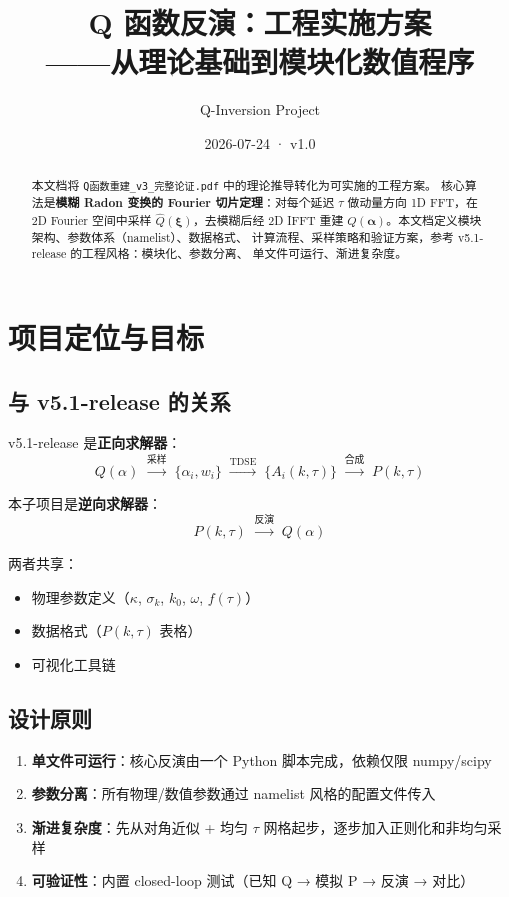 \documentclass[11pt,a4paper]{ctexart}
\title{Q 函数反演：工程实施方案\\
    \textnormal{\large ——从理论基础到模块化数值程序}}
\author{Q-Inversion Project}
\date{2026-07-24 · v1.0}
\begin{document}
\maketitle

\begin{abstract}
本文档将 \texttt{Q函数重建\_v3\_完整论证.pdf} 中的理论推导转化为可实施的工程方案。
核心算法是\textbf{模糊 Radon 变换的 Fourier 切片定理}：对每个延迟 $\tau$ 做动量方向
1D FFT，在 2D Fourier 空间中采样 $\hat{Q}(\boldsymbol{\xi})$，去模糊后经 2D IFFT
重建 $Q(\boldsymbol{\alpha})$。本文档定义模块架构、参数体系（namelist）、数据格式、
计算流程、采样策略和验证方案，参考 v5.1-release 的工程风格：模块化、参数分离、
单文件可运行、渐进复杂度。
\end{abstract}

\tableofcontents
\newpage

\section{项目定位与目标}

\subsection{与 v5.1-release 的关系}

v5.1-release 是\textbf{正向求解器}：
\[
Q(\alpha) \;\xrightarrow{\text{采样}}\; \{\alpha_i, w_i\} \;\xrightarrow{\text{TDSE}}\;
\{A_i(k,\tau)\} \;\xrightarrow{\text{合成}}\; P(k,\tau)
\]

本子项目是\textbf{逆向求解器}：
\[
P(k,\tau) \;\xrightarrow{\text{反演}}\; Q(\alpha)
\]

两者共享：
\begin{itemize}
    \item 物理参数定义（$\kappa$, $\sigma_k$, $k_0$, $\omega$, $f(\tau)$）
    \item 数据格式（$P(k,\tau)$ 表格）
    \item 可视化工具链
\end{itemize}

\subsection{设计原则}

\begin{enumerate}
    \item \textbf{单文件可运行}：核心反演由一个 Python 脚本完成，依赖仅限 numpy/scipy
    \item \textbf{参数分离}：所有物理/数值参数通过 namelist 风格的配置文件传入
    \item \textbf{渐进复杂度}：先从对角近似 + 均匀 $\tau$ 网格起步，逐步加入正则化和非均匀采样
    \item \textbf{可验证性}：内置 closed-loop 测试（已知 Q → 模拟 P → 反演 → 对比）
\end{enumerate}
\end{document}
